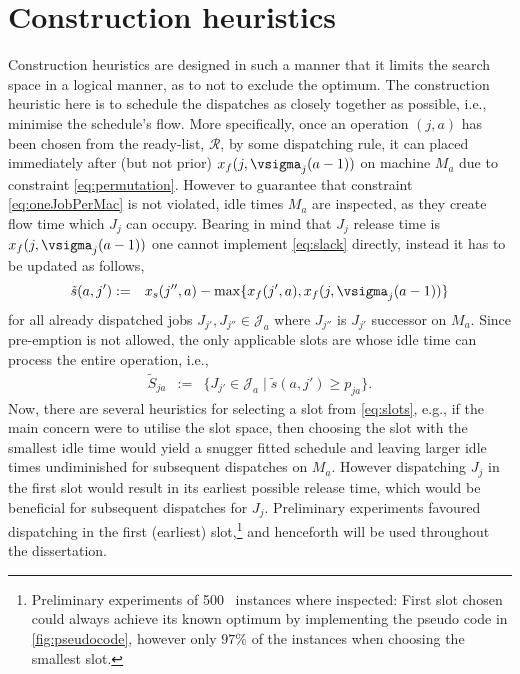 \section{Construction heuristics}\label{sec:CH}
Construction heuristics are designed in such a manner that it limits the search space in a logical manner, as to not to exclude the optimum. The construction heuristic here is to schedule the dispatches as closely together as possible, i.e., minimise the schedule's flow. 
More specifically, once an operation $(j,a)$ has been chosen from the ready-list, $\mathcal{R}$, by some dispatching rule, it can placed immediately after (but not prior) $x_f(j,\vsigma_j(a-1))$ on machine $M_a$ due to constraint \cref{eq:permutation}. 
However to guarantee that constraint \cref{eq:oneJobPerMac} is not violated, idle times $M_a$ are inspected, as they create flow time  which $J_j$ can occupy. Bearing in mind that $J_j$ release time is $x_f(j,\vsigma_j(a-1))$ one cannot implement \cref{eq:slack} directly, instead it has to be updated as follows,
\begin{eqnarray}
\tilde{s}(a,j')&:=& x_s(j'',a)-\max\{x_f(j',a),x_f(j,\vsigma_j(a-1))\} %
\end{eqnarray}
for all already dispatched jobs $J_{j'},J_{j''}\in \mathcal{J}_a$ where $J_{j''}$ is $J_{j'}$ successor on $M_a$. Since pre-emption is not allowed, the only applicable slots are whose idle time can process the entire operation, i.e.,
\begin{eqnarray}
\tilde{S}_{ja}&:=&\{J_{j'}\in \mathcal{J}_a\;|\;\tilde{s}(a,j')\geq p_{ja} \}\label{eq:slots}.
\end{eqnarray} 
Now, there are several heuristics for selecting a slot from \cref{eq:slots}, e.g., if the main concern were to utilise the slot space, then choosing the slot with the smallest idle time would yield a snugger fitted schedule and leaving larger idle times undiminished for subsequent dispatches on $M_a$. However dispatching $J_j$ in the first slot would result in its earliest possible release time, which would be beneficial for subsequent dispatches for $J_j$. Preliminary experiments favoured dispatching in the first (earliest) slot,\footnote{Preliminary experiments of 500 \JSP\ instances where inspected: First slot chosen could always achieve its known optimum by implementing the pseudo code in \cref{fig:pseudocode}, however only $97\%$ of the instances when choosing the smallest slot.} and henceforth will be used throughout the dissertation.

